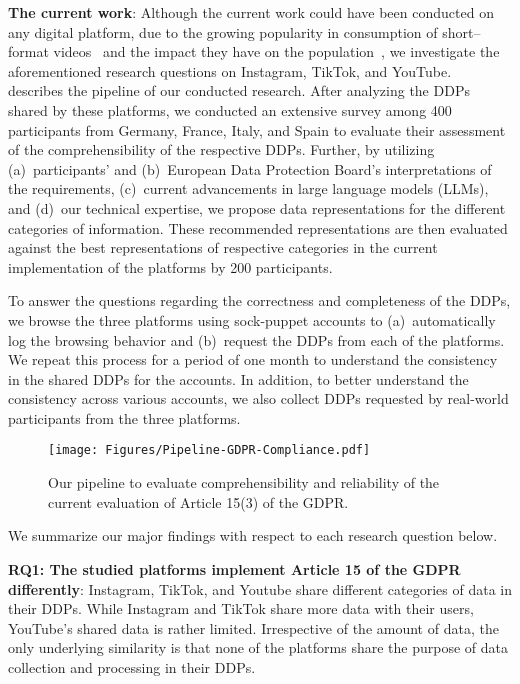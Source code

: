 \noindent
\textbf{The current work}:
Although the current work could have been conducted on any digital platform, due to the growing popularity in consumption of short--format videos~\cite{zannettou2024analyzing, Mousavi_Gummadi_Zannettou_2024} and the impact they have on the population~\cite{DSA2023VLOP}, we investigate the aforementioned research questions on Instagram, TikTok, and YouTube.
~ describes the pipeline of our conducted research.
After analyzing the DDPs shared by these platforms, we conducted an extensive survey among 400 participants from Germany, France, Italy, and Spain to evaluate their assessment of the comprehensibility of the respective DDPs. %
Further, by utilizing (a)~participants' and (b)~European Data Protection Board's interpretations of the requirements, (c)~current advancements in large language models (LLMs), and (d)~our technical expertise, we propose data representations for the different categories of information.
These recommended representations are then evaluated against the best representations of respective categories in the current implementation of the platforms by 200 participants.

To answer the questions regarding the correctness and completeness of the DDPs, we browse the three platforms using sock-puppet accounts to (a)~automatically log the browsing behavior and (b)~request the DDPs from each of the platforms. 
We repeat this process for a period of one month to understand the consistency in the shared DDPs for the accounts. 
In addition, to better understand the consistency across various accounts, we also collect DDPs requested by real-world participants from the three platforms.
\begin{figure}[t]
    \centering
    \texttt{[image: Figures/Pipeline-GDPR-Compliance.pdf]}
    \vspace{-2 mm}
    \caption{ Our pipeline to evaluate comprehensibility and reliability of the current evaluation of Article 15(3) of the GDPR.}%
    \vspace{-3 mm}
    \label{Fig: Pipeline}
\end{figure}
We summarize our major findings with respect to each research question below.

\noindent
\textbf{RQ1: The studied platforms implement Article 15 of the GDPR differently}: Instagram, TikTok, and Youtube share different categories of data in their DDPs. While Instagram and TikTok share more data with their users, YouTube's shared data is rather limited. Irrespective of the amount of data, the only underlying similarity is that none of the platforms share the purpose of data collection and processing in their DDPs.

